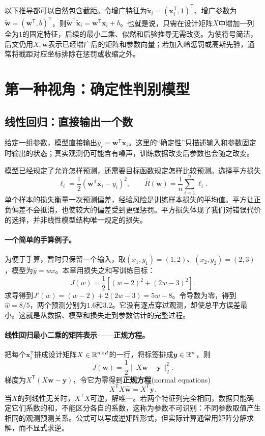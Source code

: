 以下推导都可以自然包含截距。令增广特征为$\tilde{\bm x}_i=(\bm x_i^{\mathsf T},1)^{\mathsf T}$、增广参数为$\tilde{\bm w}=(\bm w^{\mathsf T},b)^{\mathsf T}$，则$\tilde{\bm w}^{\mathsf T}\tilde{\bm x}_i=\bm w^{\mathsf T}\bm x_i+b$。也就是说，只需在设计矩阵$X$中增加一列全为$1$的固定特征，后续的最小二乘、似然和后验推导无需改变。为使符号简洁，后文仍用$X,\bm w$表示已经增广后的矩阵和参数向量；若加入岭惩罚或高斯先验，通常将截距对应坐标排除在惩罚或收缩之外。

\section{第一种视角：确定性判别模型}
\subsection{线性回归：直接输出一个数}
给定一组参数，模型直接输出$\hat y_i=\bm w^{\mathsf T}\bm x_i$。这里的“确定性”只描述输入和参数固定时输出的状态；真实观测仍可能含有噪声，训练数据改变后参数也会随之改变。

模型已经规定了允许怎样预测，还需要目标函数规定怎样比较预测。选择平方损失
\begin{equation}
 \ell_i=\frac12(\bm w^{\mathsf T}\bm x_i-y_i)^2,
 \qquad \hat R(\bm w)=\frac1n\sum_{i=1}^n\ell_i.
\end{equation}
单个样本的损失衡量一次预测偏差，经验风险是训练样本损失的平均值。平方让正负偏差不会抵消，也使较大的偏差受到更强惩罚。平方损失体现了我们对错误代价的选择，并非线性模型结构唯一规定的损失。

\paragraph{一个简单的手算例子。}
为便于手算，暂时只保留一个输入，取$(x_1,y_1)=(1,2)$、$(x_2,y_2)=(2,3)$，模型为$\hat y=wx$。本章用损失之和写训练目标：
\begin{equation}
 J(w)=\frac12[(w-2)^2+(2w-3)^2].
\end{equation}
求导得到$J'(w)=(w-2)+2(2w-3)=5w-8$。令导数为零，得到$\hat w=8/5$，两个预测分别为$1.6$和$3.2$。它没有逐点穿过观测，却使总平方误差最小。这就是从数据、模型和损失走到参数估计的完整过程。

\paragraph{线性回归最小二乘的矩阵表示——正规方程。}
把每个$\bm x_i^{\mathsf T}$排成设计矩阵$X\in\mathbb{R}^{n\times d}$的一行，将标签排成$\bm y\in\mathbb{R}^n$，则
\begin{equation}
 J(\bm w)=\frac12\|X\bm w-\bm y\|_2^2.\label{eq:linear-least-squares}
\end{equation}
梯度为$X^{\mathsf T}(X\bm w-\bm y)$，令它为零得到\textbf{正规方程}(normal equations)
\begin{equation}
 X^{\mathsf T}X\hat{\bm w}=X^{\mathsf T}\bm y.\label{eq:linear-normal-equation}
\end{equation}
当$X$的列线性无关时，$X^{\mathsf T}X$可逆，解唯一。若两个特征列完全相同，数据只能确定它们系数的和，不能区分各自的系数，这称为参数不可识别：不同参数取值产生相同的观测预测关系。公式可以写成逆矩阵形式，但实际计算通常用矩阵分解求解，而不显式求逆。

